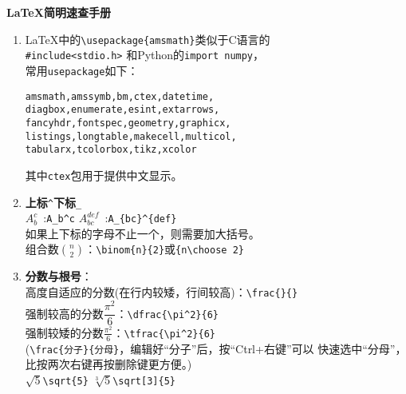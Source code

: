 \documentclass{article}
\newcommand{\q}{\quad}
\begin{document}
\begin{center}
{\Large \textbf{\LaTeX 简明速查手册} }
\end{center}  


\begin{multicols}{2}     
\begin{enumerate}

\item \LaTeX 中的\verb|\usepackage{amsmath}|类似于C语言的\\ \verb|#include<stdio.h>|
和Python的\verb|import numpy|，\\ 常用\verb|usepackage|如下：
\begin{lstlisting}
amsmath,amssymb,bm,ctex,datetime, 
diagbox,enumerate,esint,extarrows,
fancyhdr,fontspec,geometry,graphicx,
listings,longtable,makecell,multicol,
tabularx,tcolorbox,tikz,xcolor  
\end{lstlisting} 
其中\verb|ctex|包用于提供中文显示。

\item \textbf{上标}\q \verb|^|\quad \textbf{下标}\q \verb|_| \\
$ A_b^c $\ :\q \verb|A_b^c| \q\q\q\q 
$ A_{bc}^{def} $\ :\q \verb|A_{bc}^{def}| \\
如果上下标的字母不止一个，则需要加大括号。\\
组合数$ \binom{n}{2} $：\verb|\binom{n}{2}|或\verb|{n\choose 2}|

\item \textbf{分数与根号}：\\
高度自适应的分数(在行内较矮，行间较高)：\verb|\frac{}{}|\\
强制较高的分数$ \dfrac{\pi^2}{6} $：\verb|\dfrac{\pi^2}{6}| \\
强制较矮的分数$ \tfrac{\pi^2}{6} $：\verb|\tfrac{\pi^2}{6}| \\
(\verb|\frac{分子}{分母}|，编辑好“分子”后，按“Ctrl+右键”可以
快速选中“分母”，比按两次右键再按删除键更方便。)\\
$ \sqrt{5} $\q \verb|\sqrt{5}| \q\q\q\q 
$ \sqrt[3]{5} $\q \verb|\sqrt[3]{5}| 


\end{enumerate}
\end{multicols}
\end{document}
